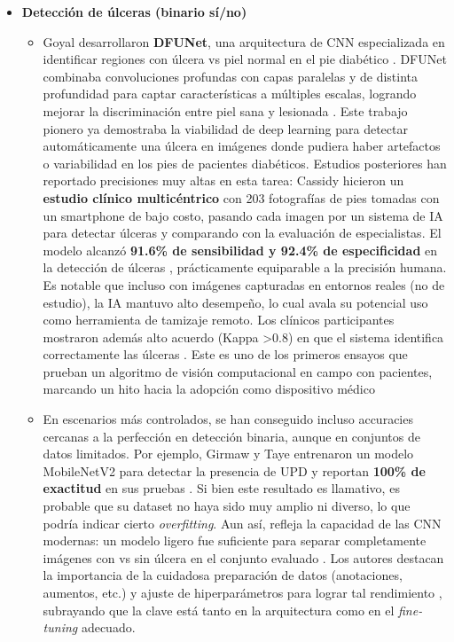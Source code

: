 \begin{itemize}
    \item \textbf{Detección de úlceras (binario sí/no)}
    \begin{itemize}
        \item Goyal \cite{Goyal2020} desarrollaron \textbf{DFUNet}, una arquitectura de CNN especializada en identificar regiones con úlcera vs piel normal en el pie diabético . DFUNet combinaba convoluciones profundas con capas paralelas y de distinta profundidad para captar características a múltiples escalas, logrando mejorar la discriminación entre piel sana y lesionada . Este trabajo pionero ya demostraba la viabilidad de deep learning para detectar automáticamente una úlcera en imágenes donde pudiera haber artefactos o variabilidad en los pies de pacientes diabéticos. Estudios posteriores han reportado precisiones muy altas en esta tarea: Cassidy \cite{Cassidy2023} hicieron un \textbf{estudio clínico multicéntrico} con 203 fotografías de pies tomadas con un smartphone de bajo costo, pasando cada imagen por un sistema de IA para detectar úlceras y comparando con la evaluación de especialistas. El modelo alcanzó \textbf{91.6\% de sensibilidad y 92.4\% de especificidad} en la detección de úlceras , prácticamente equiparable a la precisión humana. Es notable que incluso con imágenes capturadas en entornos reales (no de estudio), la IA mantuvo alto desempeño, lo cual avala su potencial uso como herramienta de tamizaje remoto. Los clínicos participantes mostraron además alto acuerdo (Kappa >0.8) en que el sistema identifica correctamente las úlceras . Este es uno de los primeros ensayos que prueban un algoritmo de visión computacional en campo con pacientes, marcando un hito hacia la adopción como dispositivo médico

        \item En escenarios más controlados, se han conseguido incluso accuracies cercanas a la perfección en detección binaria, aunque en conjuntos de datos limitados. Por ejemplo, Girmaw y Taye \cite{Girmaw2025} entrenaron un modelo MobileNetV2 para detectar la presencia de UPD y reportan \textbf{100\% de exactitud} en sus pruebas . Si bien este resultado es llamativo, es probable que su dataset no haya sido muy amplio ni diverso, lo que podría indicar cierto \textit{overfitting}. Aun así, refleja la capacidad de las CNN modernas: un modelo ligero fue suficiente para separar completamente imágenes con vs sin úlcera en el conjunto evaluado . Los autores destacan la importancia de la cuidadosa preparación de datos (anotaciones, aumentos, etc.) y ajuste de hiperparámetros para lograr tal rendimiento , subrayando que la clave está tanto en la arquitectura como en el \textit{fine-tuning} adecuado.
    \end{itemize}
        
\end{itemize}

